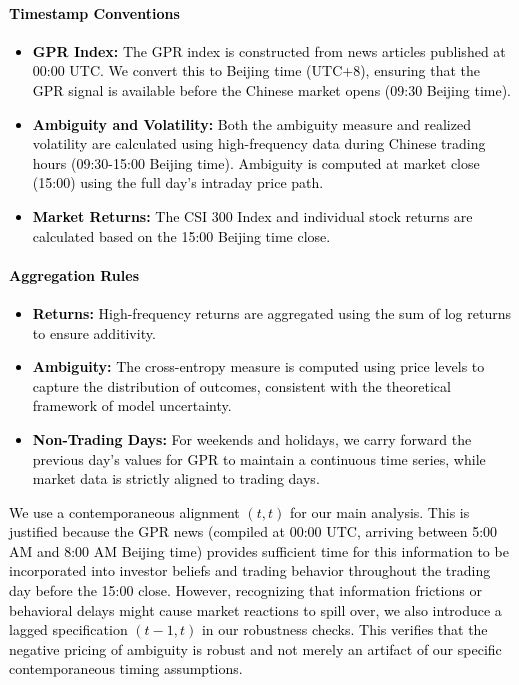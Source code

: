 \documentclass[preprint,12pt,authoryear]{elsarticle}
\begin{document}
\paragraph{\textcolor{black}{Timestamp Conventions}}
\textcolor{black}{\begin{itemize}
    \item \textbf{GPR Index:} The GPR index is constructed from news articles published at 00:00 UTC. We convert this to Beijing time (UTC+8), ensuring that the GPR signal is available before the Chinese market opens (09:30 Beijing time).
    \item \textbf{Ambiguity and Volatility:} Both the ambiguity measure and realized volatility are calculated using high-frequency data during Chinese trading hours (09:30-15:00 Beijing time). Ambiguity is computed at market close (15:00) using the full day's intraday price path.
    \item \textbf{Market Returns:} The CSI 300 Index and individual stock returns are calculated based on the 15:00 Beijing time close.
\end{itemize}}

\paragraph{\textcolor{black}{Aggregation Rules}}
\textcolor{black}{\begin{itemize}
    \item \textbf{Returns:} High-frequency returns are aggregated using the sum of log returns to ensure additivity.
    \item \textbf{Ambiguity:} The cross-entropy measure is computed using price levels to capture the distribution of outcomes, consistent with the theoretical framework of model uncertainty.
    \item \textbf{Non-Trading Days:} For weekends and holidays, we carry forward the previous day's values for GPR to maintain a continuous time series, while market data is strictly aligned to trading days.
\end{itemize}}

\textcolor{black}{We use a contemporaneous alignment $(t, t)$ for our main analysis. This is justified because the GPR news (compiled at 00:00 UTC, arriving between 5:00 AM and 8:00 AM Beijing time) provides sufficient time for this information to be incorporated into investor beliefs and trading behavior throughout the trading day before the 15:00 close. However, recognizing that information frictions or behavioral delays might cause market reactions to spill over, we also introduce a lagged specification $(t-1, t)$ in our robustness checks. This verifies that the negative pricing of ambiguity is robust and not merely an artifact of our specific contemporaneous timing assumptions.}
\end{document}
